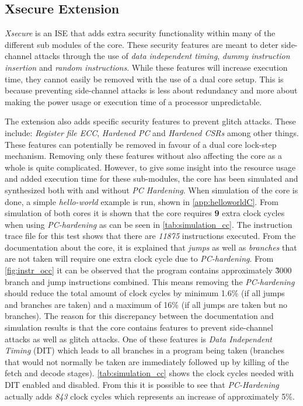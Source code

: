\subsection{Xsecure Extension}
\label{sec:xsecure}

\textit{Xsecure} is an ISE that adds extra security functionality within many of the different sub modules of the core. These security features are meant to deter side-channel attacks through the use of \textit{data independent timing}, \textit{dummy instruction insertion} and \textit{random instructions}\cite{cv32e40s_manual}. While these features will increase execution time, they cannot easily be removed with the use of a dual core setup. This is because preventing side-channel attacks is less about redundancy and more about making the power usage or execution time of a processor unpredictable. 

The extension also adds specific security features to prevent glitch attacks. These include: \textit{Register file ECC}, \textit{Hardened PC} and \textit{Hardened CSRs} among other things. These features can potentially be removed in favour of a dual core lock-step mechanism. Removing only these features without also affecting the core as a whole is quite complicated. However, to give some insight into the resource usage and added execution time for these sub-modules, the core has been simulated and synthesized both with and without \textit{PC Hardening}. When simulation of the core is done, a simple \textit{hello-world} example is run, shown in \autoref{app:helloworldC}. From simulation of both cores it is shown that the core requires \textbf{9} extra clock cycles when using \textit{PC-hardening} as can be seen in \autoref{tab:simulation_cc}. The instruction trace file for this test shows that there are \textit{11875} instructions executed. From the documentation about the core, it is explained that \textit{jumps} as well as \textit{branches} that are not taken will require one extra clock cycle due to \textit{PC-hardening}. From \autoref{fig:instr_occ} it can be observed that the program contains approximately \~ 3000 branch and jump instructions combined. This means removing the \textit{PC-hardening} should reduce the total amount of clock cycles by minimum 1.6\% (if all jumps and branches are taken) and a maximum of 16\% (if all jumps are taken but no branches). 
The reason for this discrepancy between the documentation and simulation results is that the core contains features to prevent side-channel attacks as well as glitch attacks. One of these features is \textit{Data Independent Timing} (DIT) which leads to all branches in a program being taken (branches that would not normally be taken are immediately followed up by killing of the fetch and decode stages). \autoref{tab:simulation_cc} shows the clock cycles needed with DIT enabled and disabled. From this it is possible to see that \textit{PC-Hardening} actually adds \textit{843} clock cycles which represents an increase of approximately 5\%. 


